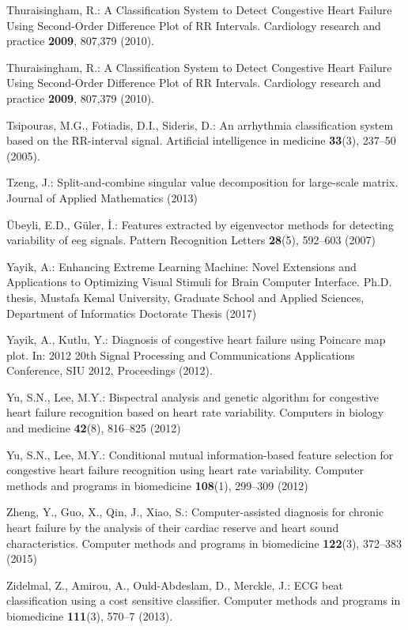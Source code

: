 \documentclass[twocolumn]{svjour3}
\begin{document}
\begin{thebibliography}{10}
Thuraisingham, R.: {A Classification System to Detect Congestive Heart Failure
  Using Second-Order Difference Plot of RR Intervals.}
\newblock Cardiology research and practice \textbf{2009}, 807,379 (2010).
\newblock {}

Thuraisingham, R.: {A Classification System to Detect Congestive Heart Failure
  Using Second-Order Difference Plot of RR Intervals.}
\newblock Cardiology research and practice \textbf{2009}, 807,379 (2010).
\newblock {}

Tsipouras, M.G., Fotiadis, D.I., Sideris, D.: {An arrhythmia classification
  system based on the RR-interval signal.}
\newblock Artificial intelligence in medicine \textbf{33}(3), 237--50 (2005).
\newblock {}

Tzeng, J.: {Split-and-combine singular value decomposition for large-scale
  matrix}.
\newblock Journal of Applied Mathematics  (2013)

{\"U}beyli, E.D., G{\"u}ler, {\.I}.: Features extracted by eigenvector methods
  for detecting variability of eeg signals.
\newblock Pattern Recognition Letters \textbf{28}(5), 592--603 (2007)

Yayik, A.: {Enhancing Extreme Learning Machine: Novel Extensions and
  Applications to Optimizing Visual Stimuli for Brain Computer Interface}.
\newblock Ph.D. thesis, Mustafa Kemal University, Graduate School and Applied
  Sciences, Department of Informatics Doctorate Thesis (2017)

Yayik, A., Kutlu, Y.: {Diagnosis of congestive heart failure using Poincare map
  plot}.
\newblock In: 2012 20th Signal Processing and Communications Applications
  Conference, SIU 2012, Proceedings (2012).
\newblock {}

Yu, S.N., Lee, M.Y.: Bispectral analysis and genetic algorithm for congestive
  heart failure recognition based on heart rate variability.
\newblock Computers in biology and medicine \textbf{42}(8), 816--825 (2012)

Yu, S.N., Lee, M.Y.: Conditional mutual information-based feature selection for
  congestive heart failure recognition using heart rate variability.
\newblock Computer methods and programs in biomedicine \textbf{108}(1),
  299--309 (2012)

Zheng, Y., Guo, X., Qin, J., Xiao, S.: {Computer-assisted diagnosis for chronic
  heart failure by the analysis of their cardiac reserve and heart sound
  characteristics}.
\newblock Computer methods and programs in biomedicine \textbf{122}(3),
  372--383 (2015)

Zidelmal, Z., Amirou, A., Ould-Abdeslam, D., Merckle, J.: {ECG beat
  classification using a cost sensitive classifier.}
\newblock Computer methods and programs in biomedicine \textbf{111}(3), 570--7
  (2013).
\newblock {}

\end{thebibliography}
 
\end{document}
